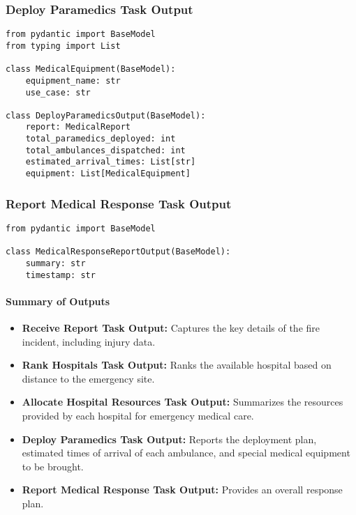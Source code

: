 \subsubsection{Deploy Paramedics Task Output}
\begin{lstlisting}[caption={Pydantic model for Deploy Paramedics Task Output}]
from pydantic import BaseModel
from typing import List

class MedicalEquipment(BaseModel):
    equipment_name: str
    use_case: str

class DeployParamedicsOutput(BaseModel):
    report: MedicalReport
    total_paramedics_deployed: int
    total_ambulances_dispatched: int
    estimated_arrival_times: List[str]
    equipment: List[MedicalEquipment]
\end{lstlisting}

\subsubsection{Report Medical Response Task Output}
\begin{lstlisting}[caption={Pydantic model for Report Medical Response Task Output}]
from pydantic import BaseModel

class MedicalResponseReportOutput(BaseModel):
    summary: str
    timestamp: str
\end{lstlisting}

\paragraph{Summary of Outputs}
\begin{itemize}
    \item \textbf{Receive Report Task Output:} Captures the key details of the fire incident, including injury data.
    \item \textbf{Rank Hospitals Task Output:} Ranks the available hospital based on distance to the emergency site.
    \item \textbf{Allocate Hospital Resources Task Output:} Summarizes the resources provided by each hospital for emergency medical care.
    \item \textbf{Deploy Paramedics Task Output:} Reports the deployment plan, estimated times of arrival of each ambulance, and special medical equipment to be brought.
    \item \textbf{Report Medical Response Task Output:} Provides an overall response plan.
\end{itemize}